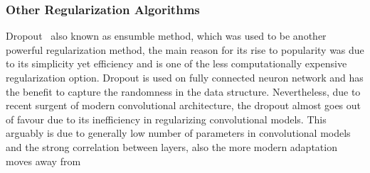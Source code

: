 \subsubsection{Other Regularization Algorithms}

Dropout~\cite{JMLR:v15:srivastava14a} also known as ensumble method, which was used to be another powerful regularization method, the main reason for its rise to popularity was due to its simplicity yet efficiency and is one of the less computationally expensive regularization option. Dropout is used on fully connected neuron network and has the benefit to capture the randomness in the data structure. Nevertheless, due to recent surgent of modern convolutional architecture, the dropout almost goes out of favour due to its inefficiency in regularizing convolutional models. This arguably is due to generally low number of parameters in convolutional models and the strong correlation between layers, also the more modern adaptation moves away from 